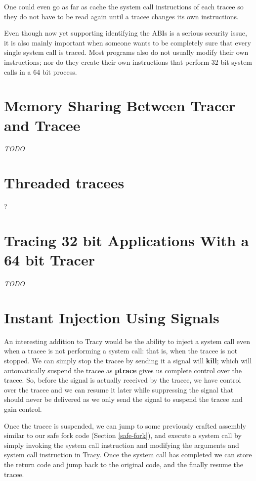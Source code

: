 \documentclass[a4paper, 10pt]{report}
\begin{document}
One could even go as far as cache the system call instructions of each tracee
so they do not have to be read again until a tracee changes its own
instructions.

Even though now yet supporting identifying the ABIs is a serious security issue,
it is also mainly important when someone wants to be completely sure that every
single system call is traced. Most programs also do not usually modify their
own instructions; nor do they create their own instructions that perform 32 bit
system calls in a 64 bit process.

\section{Memory Sharing Between Tracer and Tracee}
\label{memory-share}

\textit{TODO}


\section{Threaded tracees}?
\label{future-threaded-tracees}

\section{Tracing 32 bit Applications With a 64 bit Tracer}
\textit{TODO}

\section{Instant Injection Using Signals}
\label{instant-inject}

An interesting addition to Tracy would be the ability to inject a system call
even when a tracee is not performing a system call: that is, when the tracee
is not stopped. We can simply stop the tracee by sending it a signal will
\textbf{kill}; which will automatically suspend the tracee as
\textbf{ptrace} gives us complete control over the tracee.
So, before the signal is actually received by the tracee, we have control
over the tracee and we can resume it later while suppressing the signal that
should never be delivered as we only send the signal to suspend the tracee and
gain control.

Once the tracee is suspended, we can jump to some previously crafted assembly
similar to our safe fork code (Section \ref{safe-fork}), and execute a system
call by simply invoking the system call instruction and modifying the
arguments and system call instruction in Tracy. Once the system call
has completed we can store the return code and jump back to the original code,
and the finally resume the tracee.
\end{document}
